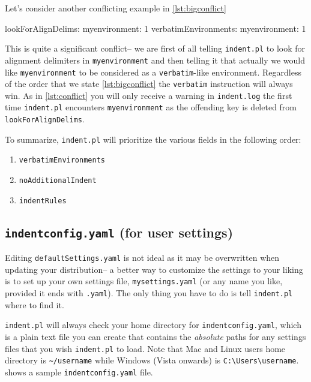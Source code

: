 Let's consider another conflicting example in \cref{lst:bigconflict}
\begin{yaml}[caption={More conflicting ideas},label={lst:bigconflict}]
lookForAlignDelims:
   myenvironment: 1
verbatimEnvironments:
   myenvironment: 1
\end{yaml}
This is quite a significant conflict-- we are first of all telling \lstinline!indent.pl!
to look for alignment delimiters in \lstinline!myenvironment! and then 
telling it that actually we would like \lstinline!myenvironment! to be considered 
as a \lstinline!verbatim!-like environment. Regardless of the order that we 
state \cref{lst:bigconflict} the \lstinline!verbatim! instruction will always win.
As in \cref{lst:conflict} you will only receive a warning in \lstinline!indent.log! the 
first time \lstinline!indent.pl! encounters \lstinline!myenvironment! as the 
offending key is deleted from \lstinline!lookForAlignDelims!.
 	 	 	 	 	
To summarize, \lstinline!indent.pl! will prioritize the various fields in the 
following order:
\begin{enumerate}
	\item \lstinline!verbatimEnvironments!
	\item \lstinline!noAdditionalIndent!
	\item \lstinline!indentRules!
\end{enumerate}
\subsection{\lstinline!indentconfig.yaml! (for user settings)}\label{sec:indentconfig}
Editing \lstinline!defaultSettings.yaml! is not ideal as it may be overwritten when 
updating your distribution-- a better way to customize the settings to your liking 
is to set up your own settings file, 
\lstinline!mysettings.yaml! (or any name you like, provided it ends with \lstinline!.yaml!). 
The only thing you have to do is tell \lstinline!indent.pl! where to find it. 
 	 	 	 	 	
\lstinline!indent.pl! will always check your home directory for \lstinline!indentconfig.yaml!, 
which is a plain text file you can create that contains the \emph{absolute}
paths for any settings files that you wish \lstinline!indent.pl! to load.
Note that Mac and Linux users home directory is \lstinline!~/username! while
Windows (Vista onwards) is \lstinline!C:\Users\username!. 
 shows a sample \lstinline!indentconfig.yaml! file.
 	 	 	 	 	
